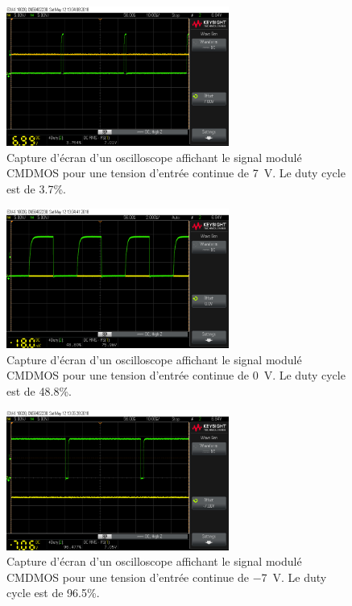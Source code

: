 \documentclass[10pt, oneside, a4paper]{article}
\begin{document}
\begin{figure}[p]
    \centering
    \includegraphics[width=0.65\textwidth]{image/12-05/scope_2.png}
    \caption{Capture d'écran d'un oscilloscope affichant le signal modulé CMDMOS pour une
             tension d'entrée continue de \SI{7}{\volt}. Le duty cycle est de \num{3.7}\%.}
    \label{fig:scope-2}
\end{figure}

\begin{figure}[p]
    \centering
    \includegraphics[width=0.65\textwidth]{image/12-05/scope_3.png}
    \caption{Capture d'écran d'un oscilloscope affichant le signal modulé CMDMOS pour une
             tension d'entrée continue de \SI{0}{\volt}. Le duty cycle est de \num{48.8}\%.}
    \label{fig:scope-3}
\end{figure}

\begin{figure}[p]
    \centering
    \includegraphics[width=0.65\textwidth]{image/12-05/scope_4.png}
    \caption{Capture d'écran d'un oscilloscope affichant le signal modulé CMDMOS pour une
             tension d'entrée continue de \SI{-7}{\volt}. Le duty cycle est de \num{96.5}\%.}
    \label{fig:scope-4}
\end{figure}
\end{document}
